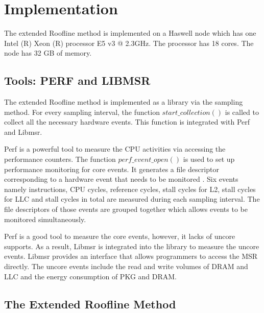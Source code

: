 \chapter{Implementation}

The extended Roofline method is implemented on a Haswell node which has one Intel (R) Xeon (R) processor E5 v3 @ 2.3GHz. The processor has 18 cores. The node has 32 GB of memory.
\section{Tools: PERF and LIBMSR}
The extended Roofline method is implemented as a library via the sampling method. For every sampling interval, the function $start\_collection()$ is called to collect all the necessary hardware events. This function is integrated with Perf and Libmsr.  

Perf is a powerful tool to measure the CPU activities via accessing the performance counters. The function $perf\_event\_open()$ is used to set up performance monitoring for core events. It generates a file descriptor corresponding to a hardware event that needs to be monitored \cite{24}. Six events namely instructions, CPU cycles, reference cycles, stall cycles for L2, stall cycles for LLC and stall cycles in total are measured during each sampling interval. The file descriptors of those events are grouped together which allows events to be monitored simultaneously.  

Perf is a good tool to measure the core events, however, it lacks of uncore supports. As a result, Libmsr \cite{25} is integrated into the library to measure the uncore events. Libmsr provides an interface that allows programmers to access the MSR directly. The uncore events include the read and write volumes of DRAM and LLC and the energy consumption of PKG and DRAM. 

\section{The Extended Roofline Method}


